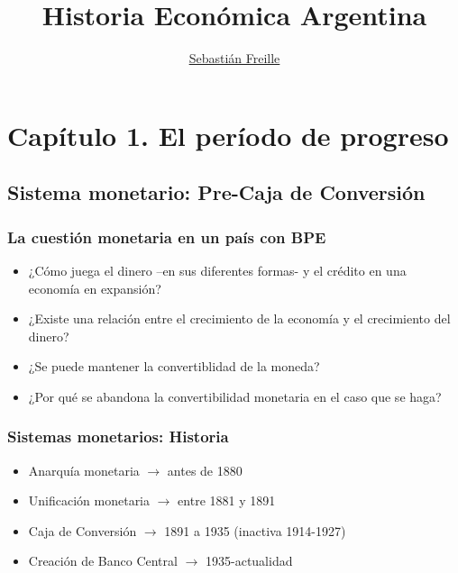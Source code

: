 \documentclass[14pt,aspectratio=169]{beamer}
\title{Historia Económica Argentina}
\author{\underline{Sebastián Freille} \inst{1}}
\institute[shortinst]{\inst{1} IEF-UNC \\ UCC}
\date{}
\begin{document}
{
  \begin{frame}
    \titlepage
  \end{frame}
}

  
  \section{Capítulo 1. El período de progreso}

  \subsection{Sistema monetario: Pre-Caja de Conversión}


  \begin{frame}\frametitle{La cuestión monetaria en un país con BPE}
     \begin{itemize}
\item ¿Cómo juega el dinero --en sus diferentes formas- y el crédito
  en una economía en expansión?
  \item ¿Existe una relación entre el crecimiento de la economía y el
    crecimiento del dinero?
     \item ¿Se puede mantener la convertiblidad de la moneda?
       \item ¿Por qué se abandona la convertibilidad
         monetaria en el caso que se haga?
                 \end{itemize}
        \end{frame}

  
\begin{frame}\frametitle{Sistemas monetarios: Historia}
     \begin{itemize}
     \item Anarquía monetaria $\longrightarrow$ antes de 1880
       \item Unificación monetaria $\longrightarrow$
         entre 1881 y 1891
       \item Caja de Conversión $\longrightarrow$ 1891 a 1935
         (inactiva 1914-1927)
         \item Creación de Banco Central $\longrightarrow$ 1935-actualidad
         \end{itemize}
        \end{frame}
\end{document}
